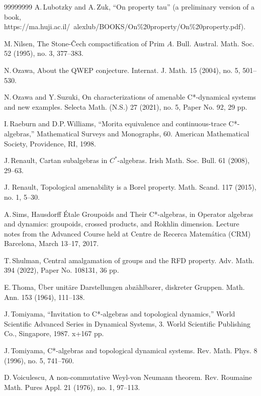 \documentclass[11 pt, leqno, hidelinks]{amsart}%
\theoremstyle{plain}
\numberwithin{equation}{section}
\begin{document}
\begin{thebibliography}{99999999}
 A.\,Lubotzky and A.\,Zuk, ``On property tau'' (a preliminary version of a book, https://ma.huji.ac.il/~alexlub/BOOKS/On\%20property/On\%20property.pdf).

 M.\,Nilsen, The Stone-Čech compactification of Prim $A$. Bull. Austral. Math. Soc. 52 (1995), no. 3, 377--383.

N.\,Ozawa,
About the QWEP conjecture.
Internat. J. Math. 15 (2004), no. 5, 501--530.

N.\,Ozawa and Y.\,Suzuki, On characterizations of amenable C*-dynamical systems and new examples. Selecta Math. (N.S.) 27 (2021), no. 5, Paper No. 92, 29 pp.


  I.\,Raeburn and D.P.\,Williams,
``Morita equivalence and continuous-trace C*-algebras,''
Mathematical Surveys and Monographs, 60. American Mathematical Society, Providence, RI, 1998.


 J.\,Renault,  Cartan subalgebras in {$C^\ast$}-algebras. Irish Math. Soc. Bull. 61 (2008), 29--63.

J. Renault, Topological amenability is a Borel property. Math. Scand. 117 (2015), no. 1,
5--30.


A.\,Sims, Hausdorff \'Etale Groupoids and Their C*-algebras, in
Operator algebras and dynamics: groupoids, crossed products, and Rokhlin dimension. Lecture notes from the Advanced Course held at Centre de Recerca Matem\'atica (CRM) Barcelona, March 13--17, 2017.


 T.\,Shulman,
Central amalgamation of groups and the RFD property. Adv. Math. 394 (2022), Paper No. 108131, 36 pp.


E.\,Thoma,
\"Uber unit\"are Darstellungen abz\"ahlbarer, diskreter Gruppen. Math. Ann. 153 (1964), 111--138.

 J.\,Tomiyama, ``Invitation to C*-algebras and topological dynamics,'' World Scientific Advanced Series in Dynamical Systems, 3. World Scientific Publishing Co., Singapore, 1987. x+167 pp.

J.\,Tomiyama, C*-algebras and topological dynamical systems. Rev. Math. Phys. 8 (1996), no. 5, 741--760.

D.\,Voiculescu, A non-commutative Weyl-von Neumann theorem. Rev. Roumaine Math. Pures Appl. 21 (1976), no. 1, 97--113.


\end{thebibliography}
\end{document}
